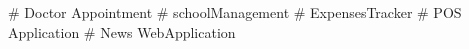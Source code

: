 # Doctor Appointment
# schoolManagement
# ExpensesTracker
# POS Application 
# News WebApplication 



